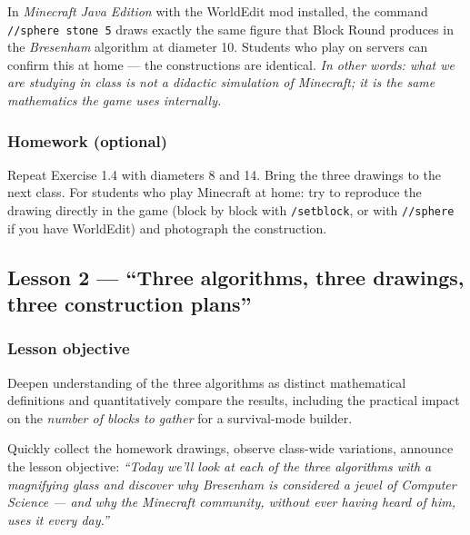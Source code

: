 \documentclass[12pt,a4paper]{scrartcl}
\newcommand{\cmd}[1]{\textcolor{earth}{\texttt{\small #1}}}
\newcommand{\timetag}[1]{\textnormal{\footnotesize\color{bg!90!white}\textsf{#1}}}
\begin{document}
\begin{minecraft}
In \emph{Minecraft Java Edition} with the WorldEdit mod installed, the command \cmd{//sphere stone 5} draws exactly the same figure that Block Round produces in the \emph{Bresenham} algorithm at diameter 10. Students who play on servers can confirm this at home --- the constructions are identical. \emph{In other words: what we are studying in class is not a didactic simulation of Minecraft; it is the same mathematics the game uses internally.}
\end{minecraft}

\subsubsection*{Homework (optional)}
Repeat Exercise 1.4 with diameters 8 and 14. Bring the three drawings to the next class. For students who play Minecraft at home: try to reproduce the drawing directly in the game (block by block with \cmd{/setblock}, or with \cmd{//sphere} if you have WorldEdit) and photograph the construction.

\subsection{Lesson 2 --- \enquote{Three algorithms, three drawings, three construction plans}}\label{lesson2}

\subsubsection*{Lesson objective}
Deepen understanding of the three algorithms as distinct mathematical definitions and quantitatively compare the results, including the practical impact on the \emph{number of blocks to gather} for a survival-mode builder.

\begin{activity}[2.1 --- Warm-up \quad\timetag{5 min}]
Quickly collect the homework drawings, observe class-wide variations, announce the lesson objective: \emph{\enquote{Today we'll look at each of the three algorithms with a magnifying glass and discover why Bresenham is considered a jewel of Computer Science --- and why the Minecraft community, without ever having heard of him, uses it every day.}}
\end{activity}
\end{document}
